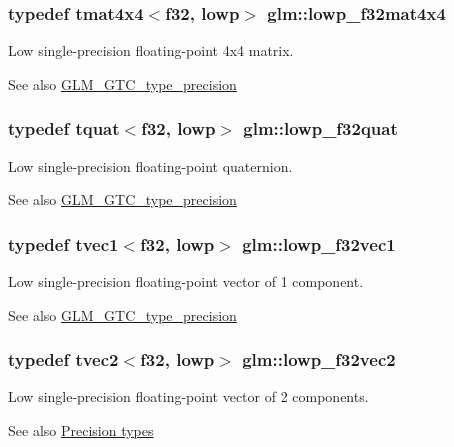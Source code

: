 \subsubsection[{lowp\+\_\+f32mat4x4}]{\setlength{\rightskip}{0pt plus 5cm}typedef tmat4x4$<${\bf f32}, lowp$>$ {\bf glm\+::lowp\+\_\+f32mat4x4}}\label{namespaceglm_a2cb18a3aae9d4e53dbae4554089cc056}
Low single-\/precision floating-\/point 4x4 matrix. \begin{DoxySeeAlso}{See also}
\hyperlink{group__gtc__type__precision}{G\+L\+M\+\_\+\+G\+T\+C\+\_\+type\+\_\+precision} 
\end{DoxySeeAlso}
\hypertarget{namespaceglm_a59419a39521ca7437483b85c4f53a21a}{}
\subsubsection[{lowp\+\_\+f32quat}]{\setlength{\rightskip}{0pt plus 5cm}typedef {\bf tquat}$<${\bf f32}, lowp$>$ {\bf glm\+::lowp\+\_\+f32quat}}\label{namespaceglm_a59419a39521ca7437483b85c4f53a21a}
Low single-\/precision floating-\/point quaternion. \begin{DoxySeeAlso}{See also}
\hyperlink{group__gtc__type__precision}{G\+L\+M\+\_\+\+G\+T\+C\+\_\+type\+\_\+precision} 
\end{DoxySeeAlso}
\hypertarget{namespaceglm_acadcba10231e2ba826ef5795f524daad}{}
\subsubsection[{lowp\+\_\+f32vec1}]{\setlength{\rightskip}{0pt plus 5cm}typedef tvec1$<${\bf f32}, lowp$>$ {\bf glm\+::lowp\+\_\+f32vec1}}\label{namespaceglm_acadcba10231e2ba826ef5795f524daad}
Low single-\/precision floating-\/point vector of 1 component. \begin{DoxySeeAlso}{See also}
\hyperlink{group__gtc__type__precision}{G\+L\+M\+\_\+\+G\+T\+C\+\_\+type\+\_\+precision} 
\end{DoxySeeAlso}
\hypertarget{namespaceglm_a4e41fc469ff2c4f82bfc01fab531ec84}{}
\subsubsection[{lowp\+\_\+f32vec2}]{\setlength{\rightskip}{0pt plus 5cm}typedef tvec2$<${\bf f32}, lowp$>$ {\bf glm\+::lowp\+\_\+f32vec2}}\label{namespaceglm_a4e41fc469ff2c4f82bfc01fab531ec84}
Low single-\/precision floating-\/point vector of 2 components. \begin{DoxySeeAlso}{See also}
\hyperlink{group__core__precision}{Precision types} 
\end{DoxySeeAlso}
\hypertarget{namespaceglm_a20fd0e645527d92ef2cc90fd9f381b77}{}
